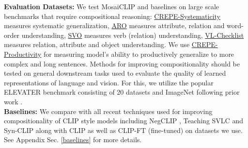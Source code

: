 \documentclass[11pt]{article}
\newcommand{\methodcomp}{MosaiCLIP}
\begin{document}
\label{sec_experiments}
\noindent \textbf{Evaluation Datasets:}
We test \methodcomp{} and baselines on large scale benchmarks that require compositional reasoning: \underline{CREPE-Systematicity} \cite{ma2022crepe} measures systematic generalization, \underline{ARO} \cite{yuksekgonul2022and} measures attribute, relation and word-order understanding, \underline{SVO} \cite{hendricks-nematzadeh-2021-probing} measures verb (relation) understanding, \underline{VL-Checklist} \cite{zhao2022vlchecklist} measures relation, attribute and object understanding. We use \underline{CREPE-Productivity} \cite{ma2022crepe} for measuring model's ability to productively generalize to more complex and long sentences.
Methods for improving compositionality should be tested on general downstream tasks used to evaluate the quality of learned representations of language and vision. For this, we utilize the popular ELEVATER benchmark \cite{li2022elevater} consisting of 20 datasets and ImageNet \cite{deng2009ImageNet} following prior work \citep{doveh2023teaching}.\\
\noindent \textbf{Baselines:} We compare with all recent techniques used for improving compositionality of CLIP style models including NegCLIP \citep{yuksekgonul2022and}, Teaching SVLC \citep{doveh2023teaching} and Syn-CLIP \citep{cascantebonilla2023going} along with CLIP \citep{radford2021learning} as well as CLIP-FT (fine-tuned) on datasets we use. See Appendix Sec. \ref{baselines} for more details. 
\end{document}

